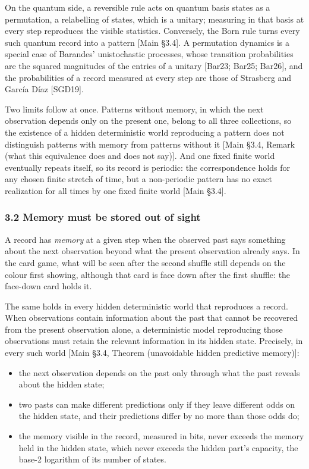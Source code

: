 \documentclass[
]{article}
\providecommand{\tightlist}{%
  \setlength{\itemsep}{0pt}\setlength{\parskip}{0pt}}
\begin{document}
On the quantum side, a reversible rule acts on quantum basis states as a
permutation, a relabelling of states, which is a unitary; measuring in
that basis at every step reproduces the visible statistics. Conversely,
the Born rule turns every such quantum record into a pattern {[}Main
§3.4{]}. A permutation dynamics is a special case of Barandes'
unistochastic processes, whose transition probabilities are the squared
magnitudes of the entries of a unitary {[}Bar23; Bar25; Bar26{]}, and
the probabilities of a record measured at every step are those of
Strasberg and García Díaz {[}SGD19{]}.

Two limits follow at once. Patterns without memory, in which the next
observation depends only on the present one, belong to all three
collections, so the existence of a hidden deterministic world
reproducing a pattern does not distinguish patterns with memory from
patterns without it {[}Main §3.4, Remark (what this equivalence does and
does not say){]}. And one fixed finite world eventually repeats itself,
so its record is periodic: the correspondence holds for any chosen
finite stretch of time, but a non-periodic pattern has no exact
realization for all times by one fixed finite world {[}Main §3.4{]}.

\hypertarget{memory-must-be-stored-out-of-sight}{%
\subsubsection{3.2 Memory must be stored out of
sight}\label{memory-must-be-stored-out-of-sight}}

A record has \emph{memory} at a given step when the observed past says
something about the next observation beyond what the present observation
already says. In the card game, what will be seen after the second
shuffle still depends on the colour first showing, although that card is
face down after the first shuffle: the face-down card holds it.

The same holds in every hidden deterministic world that reproduces a
record. When observations contain information about the past that cannot
be recovered from the present observation alone, a deterministic model
reproducing those observations must retain the relevant information in
its hidden state. Precisely, in every such world {[}Main §3.4, Theorem
(unavoidable hidden predictive memory){]}:

\begin{itemize}
\tightlist
\item
  the next observation depends on the past only through what the past
  reveals about the hidden state;
\item
  two pasts can make different predictions only if they leave different
  odds on the hidden state, and their predictions differ by no more than
  those odds do;
\item
  the memory visible in the record, measured in bits, never exceeds the
  memory held in the hidden state, which never exceeds the hidden part's
  capacity, the base-2 logarithm of its number of states.
\end{itemize}
\end{document}
